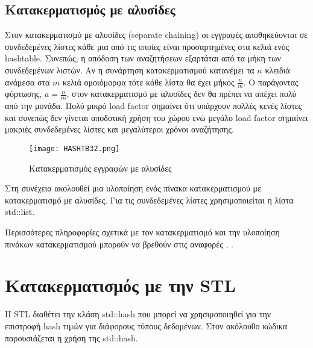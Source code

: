 

\subsection{Κατακερματισμός με αλυσίδες}
Στον κατακερματισμό με αλυσίδες (separate chaining) οι εγγραφές αποθηκεύονται σε συνδεδεμένες λίστες κάθε μια από τις οποίες είναι προσαρτημένες στα κελιά ενός hashtable. Συνεπώς, η απόδοση των αναζητήσεων εξαρτάται από τα μήκη των συνδεδεμένων λιστών. Αν η συνάρτηση κατακερματισμού κατανέμει τα $n$ κλειδιά ανάμεσα στα $m$ κελιά ομοιόμορφα τότε κάθε λίστα θα έχει μήκος $\frac{n}{m}$. O παράγοντας φόρτωσης, $a=\frac{n}{m}$, στον κατακερματισμό με αλυσίδες δεν θα πρέπει να απέχει πολύ από την μονάδα. Πολύ μικρό load factor σημαίνει ότι υπάρχουν πολλές κενές λίστες και συνεπώς δεν γίνεται αποδοτική χρήση του χώρου ενώ μεγάλο load factor σημαίνει μακριές συνδεδεμένες λίστες και μεγαλύτεροι χρόνοι αναζήτησης. 

\begin{figure}[ht!]
\centering
\texttt{[image: HASHTB32.png]}
\caption{Κατακερματισμός εγγραφών με αλυσίδες \cite{wiki_hashtables}}
\label{fig:hashtable3}
\end{figure}

Στη συνέχεια ακολουθεί μια υλοποίηση ενός πίνακα κατακερματισμού με κατακερματισμό με αλυσίδες. Για τις συνδεδεμένες λίστες χρησιμοποιείται η λίστα std::list.





Περισσότερες πληροφορίες σχετικά με τον κατακερματισμό και την υλοποίηση πινάκων κατακερματισμού μπορούν να βρεθούν στις αναφορές \cite{pumpkin_hashtables}, \cite{hackerearth_hashtables}.

\section{Κατακερματισμός με την STL}
Η STL διαθέτει την κλάση std::hash που μπορεί να χρησιμοποιηθεί για την επιστροφή hash τιμών για διάφορους τύπους δεδομένων. Στον ακόλουθο κώδικα παρουσιάζεται η χρήση της std::hash.




 

